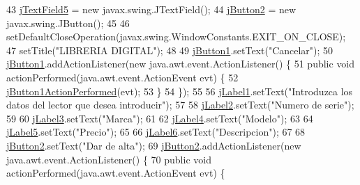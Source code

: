 \begin{DoxyCode}
43         \mbox{\hyperlink{class_interfaz_package_1_1_alta_lectores_a8486f57ea492fe17d177c837d057d73e}{jTextField5}} = \textcolor{keyword}{new} javax.swing.JTextField();
44         \mbox{\hyperlink{class_interfaz_package_1_1_alta_lectores_a8e96fe07c387d4a3215d30dc25442f6a}{jButton2}} = \textcolor{keyword}{new} javax.swing.JButton();
45 
46         setDefaultCloseOperation(javax.swing.WindowConstants.EXIT\_ON\_CLOSE);
47         setTitle(\textcolor{stringliteral}{"LIBRERIA DIGITAL"});
48 
49         \mbox{\hyperlink{class_interfaz_package_1_1_alta_lectores_a022b628c2a9a98d3d2e05f2776bad642}{jButton1}}.setText(\textcolor{stringliteral}{"Cancelar"});
50         \mbox{\hyperlink{class_interfaz_package_1_1_alta_lectores_a022b628c2a9a98d3d2e05f2776bad642}{jButton1}}.addActionListener(\textcolor{keyword}{new} java.awt.event.ActionListener() \{
51             \textcolor{keyword}{public} \textcolor{keywordtype}{void} actionPerformed(java.awt.event.ActionEvent evt) \{
52                 \mbox{\hyperlink{class_interfaz_package_1_1_alta_lectores_af6d6d0a98b0748f84e8cf4bf8ef3d153}{jButton1ActionPerformed}}(evt);
53             \}
54         \});
55 
56         \mbox{\hyperlink{class_interfaz_package_1_1_alta_lectores_a3c66bd5bf27274226564fa37c644c9e7}{jLabel1}}.setText(\textcolor{stringliteral}{"Introduzca los datos del lector que desea introducir"});
57 
58         \mbox{\hyperlink{class_interfaz_package_1_1_alta_lectores_adfb75b51296b24b4165ef9d2ffe4e9fd}{jLabel2}}.setText(\textcolor{stringliteral}{"Numero de serie"});
59 
60         \mbox{\hyperlink{class_interfaz_package_1_1_alta_lectores_a8540271f20afc2b5d9e7b8ece4ec5e93}{jLabel3}}.setText(\textcolor{stringliteral}{"Marca"});
61 
62         \mbox{\hyperlink{class_interfaz_package_1_1_alta_lectores_a39c95238a43795188e9eeeafa177e0c8}{jLabel4}}.setText(\textcolor{stringliteral}{"Modelo"});
63 
64         \mbox{\hyperlink{class_interfaz_package_1_1_alta_lectores_a59070bf77faf3741fbd2648451cd3075}{jLabel5}}.setText(\textcolor{stringliteral}{"Precio"});
65 
66         \mbox{\hyperlink{class_interfaz_package_1_1_alta_lectores_a8af45e7375fe9c6f739b4d5bc09bb983}{jLabel6}}.setText(\textcolor{stringliteral}{"Descripcion"});
67 
68         \mbox{\hyperlink{class_interfaz_package_1_1_alta_lectores_a8e96fe07c387d4a3215d30dc25442f6a}{jButton2}}.setText(\textcolor{stringliteral}{"Dar de alta"});
69         \mbox{\hyperlink{class_interfaz_package_1_1_alta_lectores_a8e96fe07c387d4a3215d30dc25442f6a}{jButton2}}.addActionListener(\textcolor{keyword}{new} java.awt.event.ActionListener() \{
70             \textcolor{keyword}{public} \textcolor{keywordtype}{void} actionPerformed(java.awt.event.ActionEvent evt) \{

\end{DoxyCode}

